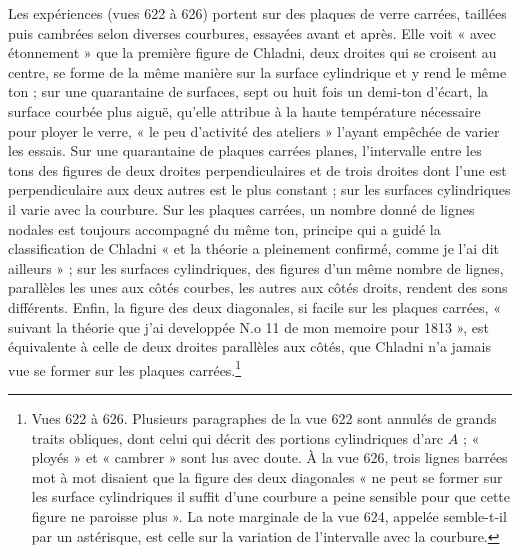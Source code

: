 \documentclass[11pt,a4paper]{article}
\begin{document}
Les expériences (vues 622 à 626) portent sur des plaques de verre carrées, taillées
puis cambrées selon diverses courbures, essayées avant et après. Elle voit « avec
étonnement » que la première figure de Chladni, deux droites qui se croisent au centre,
se forme de la même manière sur la surface cylindrique et y rend le même ton ; sur une
quarantaine de surfaces, sept ou huit fois un demi-ton d'écart, la surface courbée plus
aiguë, qu'elle attribue à la haute température nécessaire pour ployer le verre, « le
peu d'activité des ateliers » l'ayant empêchée de varier les essais. Sur une quarantaine
de plaques carrées planes, l'intervalle entre les tons des figures de deux droites
perpendiculaires et de trois droites dont l'une est perpendiculaire aux deux autres est
le plus constant ; sur les surfaces cylindriques il varie avec la courbure. Sur les
plaques carrées, un nombre donné de lignes nodales est toujours accompagné du même ton,
principe qui a guidé la classification de Chladni « et la théorie a pleinement
confirmé, comme je l'ai dit ailleurs » ; sur les surfaces cylindriques, des figures
d'un même nombre de lignes, parallèles les unes aux côtés courbes, les autres aux côtés
droits, rendent des sons différents. Enfin, la figure des deux diagonales, si facile
sur les plaques carrées, « suivant la théorie que j'ai developpée N.o 11 de mon memoire
pour 1813 », est équivalente à celle de deux droites parallèles aux côtés, que Chladni
n'a jamais vue se former sur les plaques carrées.\footnote{Vues 622 à 626. Plusieurs
paragraphes de la vue 622 sont annulés de grands traits obliques, dont celui qui
décrit des portions cylindriques d'arc $A$ ; « ployés » et « cambrer » sont lus avec
doute. À la vue 626, trois lignes barrées mot à mot disaient que la figure des deux
diagonales « ne peut se former sur les surface cylindriques il suffit d'une courbure a
peine sensible pour que cette figure ne paroisse plus ». La note marginale de la vue
624, appelée semble-t-il par un astérisque, est celle sur la variation de l'intervalle
avec la courbure.}
\end{document}
